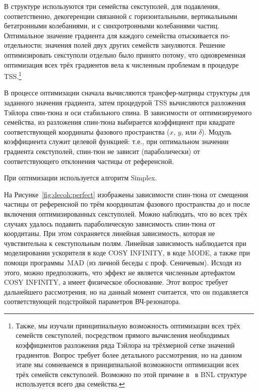 В структуре используются три семейства секступолей, для подавления, соответственно, декогеренции связанной 
с горизонтальными, вертикальными бетатронными колебаниями, и с синхротронными колебаниями частиц.
Оптимальное значение градиента для каждого семейства отыскивается по-отдельности; значения полей двух
других семейств зануляются. Решение оптимизировать секступоли отдельно было принято потому, что
одновременная оптимизация всех трёх градиентов вела к численным проблемам в процедуре TSS.\footnote{Также,
мы изучали принципиальную возможность оптимизации всех трёх семейств секступолей, посредством прямого
вычисления необходимых коэффициентов разложения ряда Тэйлора на трёхмерной сетке значений градиентов. 
Вопрос требует более детального рассмотрения, но на данном этапе мы сомневаемся в принципиальной возможности
оптимизации всех трёх семейств секступолей. Возможно по этой причине в~\cite[стр.~219]{Eremey:Thesis} в BNL структуре
используется всего два семейства.}

В процессе оптимизации сначала вычисляются трансфер-матрицы структуры для заданного значения градиента, 
затем процедурой TSS вычисляются разложения Тэйлора спин-тюна и оси стабильного спина. В зависимости от 
оптимизируемого семейства, из разложения спин-тюна выбирается коэффициент при квадрате соответствующей
координаты фазового пространства ($x$, $y$, или $\delta$). Модуль коэффициента служит целевой функцией: т.е., 
при оптимальном значении градиента секступолей, спин-тюн не зависит (параболически) от соответствующего отклонения частицы от референсной.

При оптимизации используется алгоритм Simplex.~\cite[стр.~37]{COSYINF:Manual:Programmer}

На Рисунке~\ref{fig:decoh:perfect} изображены зависимости спин-тюна от смещения частицы от референсной по трём
координатам фазового пространства до и после включения оптимизированных секступолей. Можно наблюдать, что во 
всех трёх случаях удалось подавить параболическую зависимость спин-тюна от коордитаны. При этом сохраняется 
линейная зависимость, которая не чувствительна к секступольным полям. Линейная зависимость наблюдается при
моделировании ускорителя в коде COSY INFINITY, в коде MODE, а также при помощи программы MAD (из личной беседы
с проф. Сеничевым). Исходя из этого, можно предположить, что эффект не является численным артефактом COSY 
INFINITY, а имеет физическое обоснование. Этот вопрос требует дальнейшего рассмотрения, но на данный момент
считается, что он подавляется соответствующей подстройкой параметров ВЧ-резонатора.~\cite[стр.~210,~219]{Eremey:Thesis}

